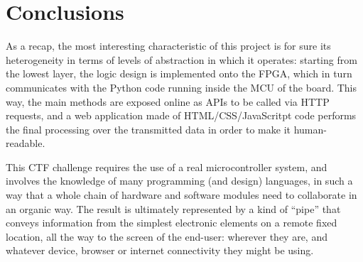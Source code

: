 \chapter{Conclusions}
\label{Chapter6}
As a recap, the most interesting characteristic of this project is for sure its heterogeneity in terms of levels of abstraction in which it operates: starting from the lowest layer, the logic design is implemented onto the FPGA, which in turn communicates with the Python code running inside the MCU of the board.
This way, the main methods are exposed online as APIs to be called via HTTP requests, and a web application made of HTML/CSS/JavaScritpt code performs the final processing over the transmitted data in order to make it human-readable.

This CTF challenge requires the use of a real microcontroller system, and involves the knowledge of many programming (and design) languages, in such a way that a whole chain of hardware and software modules need to collaborate in an organic way.
The result is ultimately represented by a kind of ``pipe'' that conveys information from the simplest electronic elements on a remote fixed location, all the way to the screen of the end-user: wherever they are, and whatever device, browser or internet connectivity they might be using.